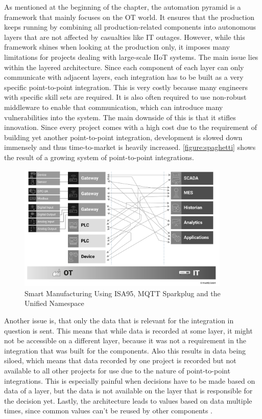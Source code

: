     As mentioned at the beginning of the chapter, the automation pyramid is a framework that mainly focuses on the OT world. It ensures that the production keeps running by combining all production-related components into autonomous layers that are not affected by casualties like IT outages. However, while this framework shines when looking at the production only, it imposes many limitations for projects dealing with large-scale IIoT systems. The main issue lies within the layered architecture. Since each component of each layer can only communicate with adjacent layers, each integration has to be built as a very specific point-to-point integration. This is very costly because many engineers with specific skill sets are required. It is also often required to use non-robust middleware to enable that communication, which can introduce many vulnerabilities into the system. The main downside of this is that it stifles innovation. Since every project comes with a high cost due to the requirement of building yet another point-to-point integration, development is slowed down immensely and thus time-to-market is heavily increased. \autoref{figure:spaghetti} shows the result of a growing system of point-to-point integrations.
    
    \begin{figure}[htbp]
        \centering
        \includegraphics[width=0.9\textwidth]{img/sparkplug-01-spaghetti.png}
        \caption{Smart Manufacturing Using ISA95, MQTT Sparkplug and the Unified Namespace \cite{smart_manufacturing_using_isa95_mqtt}}
        \label{figure:spaghetti}
    \end{figure}
    
    Another issue is, that only the data that is relevant for the integration in question is sent. This means that while data is recorded at some layer, it might not be accessible on a different layer, because it was not a requirement in the integration that was built for the components. Also this results in data being siloed, which means that data recorded by one project is recorded but not available to all other projects for use due to the nature of point-to-point integrations. This is especially painful when decisions have to be made based on data of a layer, but the data is not available on the layer that is responsible for the decision yet. Lastly, the architecture leads to values based on data multiple times, since common values can't be reused by other components \cite{umh_automation_pyramid}. \newline

